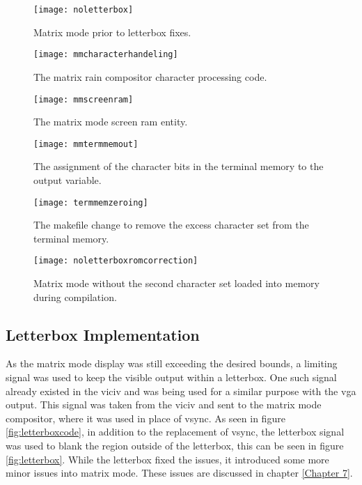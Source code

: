 \begin{figure}
  \centering
  \texttt{[image: noletterbox]}
  \caption{Matrix mode prior to letterbox fixes.}
  \label{fig:noletterbox}
\end{figure}

\begin{figure}
  \centering
  \texttt{[image: mmcharacterhandeling]}
  \caption{The matrix rain compositor character processing code.}
  \label{fig:mmcharacterhandeling}
\end{figure}

\begin{figure}
  \centering
  \texttt{[image: mmscreenram]}
  \caption{The matrix mode screen ram entity.}
  \label{fig:mmscreenram}
\end{figure}

\begin{figure}
  \centering
  \texttt{[image: mmtermmemout]}
  \caption{The assignment of the character bits in the terminal memory to the output variable.}
  \label{fig:mmtermmemout}
\end{figure}

\begin{figure}
  \centering
  \texttt{[image: termmemzeroing]}
  \caption{The makefile change to remove the excess character set from the terminal memory.}
  \label{fig:termmemzeroing}
\end{figure}

\begin{figure}
  \centering
  \texttt{[image: noletterboxromcorrection]}
  \caption{Matrix mode without the second character set loaded into memory during compilation.}
  \label{fig:noletterboxromcorrection}
\end{figure}


\subsection{Letterbox Implementation}

\label{Ch5 Sec2 Sub2}

As the matrix mode display was still exceeding the desired bounds, a limiting signal was used to keep the visible output within a letterbox. One such signal already existed in the viciv and was being used for a similar purpose with the vga output. This signal was taken from the viciv and sent to the matrix mode compositor, where it was used in place of vsync. As seen in figure \ref{fig:letterboxcode}, in addition to the replacement of vsync, the letterbox signal was used to blank the region outside of the letterbox, this can be seen in figure \ref{fig:letterbox}. While the letterbox fixed the issues, it introduced some more minor issues into matrix mode. These issues are discussed in chapter \ref{Chapter 7}.

